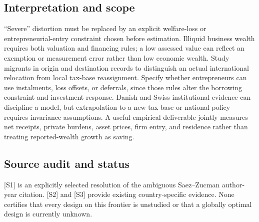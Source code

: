 \documentclass[11pt,a4paper]{article}
\begin{document}
\subsection*{Interpretation and scope}
“Severe” distortion must be replaced by an explicit welfare-loss or entrepreneurial-entry constraint chosen before estimation. Illiquid business wealth requires both valuation and financing rules; a low assessed value can reflect an exemption or measurement error rather than low economic wealth. Study migrants in origin and destination records to distinguish an actual international relocation from local tax-base reassignment. Specify whether entrepreneurs can use instalments, loss offsets, or deferrals, since those rules alter the borrowing constraint and investment response. Danish and Swiss institutional evidence can discipline a model, but extrapolation to a new tax base or national policy requires invariance assumptions. A useful empirical deliverable jointly measures net receipts, private burdens, asset prices, firm entry, and residence rather than treating reported-wealth growth as saving.

\subsection*{Source audit and status}
[S1] is an explicitly selected resolution of the ambiguous Saez--Zucman author-year citation. [S2] and [S3] provide existing country-specific evidence. None certifies that every design on this frontier is unstudied or that a globally optimal design is currently unknown.
\end{document}
